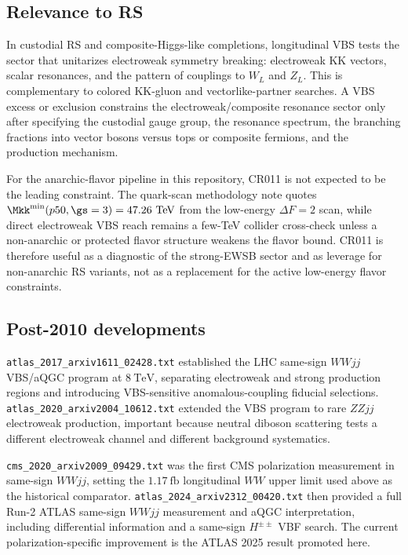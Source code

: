 \subsection*{Relevance to RS}
In custodial RS and composite-Higgs-like completions, longitudinal VBS tests
the sector that unitarizes electroweak symmetry breaking: electroweak KK
vectors, scalar resonances, and the pattern of couplings to \(W_L\) and \(Z_L\).
This is complementary to colored KK-gluon and vectorlike-partner searches.  A
VBS excess or exclusion constrains the electroweak/composite resonance sector
only after specifying the custodial gauge group, the resonance spectrum, the
branching fractions into vector bosons versus tops or composite fermions, and
the production mechanism.

For the anarchic-flavor pipeline in this repository, CR011 is not expected to
be the leading constraint.  The quark-scan methodology note quotes
\(\Mkk^{\min}(p50,\gs=3)=47.26~\mathrm{TeV}\) from the low-energy
\(\Delta F=2\) scan, while direct electroweak VBS reach remains a few-TeV
collider cross-check unless a non-anarchic or protected flavor structure
weakens the flavor bound.  CR011 is therefore useful as a diagnostic of the
strong-EWSB sector and as leverage for non-anarchic RS variants, not as a
replacement for the active low-energy flavor constraints.

\subsection*{Post-2010 developments}
\texttt{atlas\_2017\_arxiv1611\_02428.txt} established the LHC same-sign
\(WWjj\) VBS/aQGC program at \(8~\mathrm{TeV}\), separating electroweak and
strong production regions and introducing VBS-sensitive anomalous-coupling
fiducial selections.  \texttt{atlas\_2020\_arxiv2004\_10612.txt} extended the
VBS program to rare \(ZZjj\) electroweak production, important because neutral
diboson scattering tests a different electroweak channel and different
background systematics.

\texttt{cms\_2020\_arxiv2009\_09429.txt} was the first CMS polarization
measurement in same-sign \(WWjj\), setting the \(1.17~\mathrm{fb}\) longitudinal
\(WW\) upper limit used above as the historical comparator.
\texttt{atlas\_2024\_arxiv2312\_00420.txt} then provided a full Run-2 ATLAS
same-sign \(WWjj\) measurement and aQGC interpretation, including differential
information and a same-sign \(H^{\pm\pm}\) VBF search.  The current
polarization-specific improvement is the ATLAS 2025 result promoted here.


